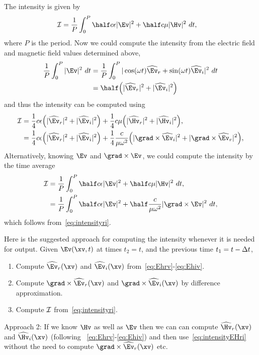 The intensity is given by 
\begin{align*}
  \Ic &= {1\over P} \int_0^P \half c\eps \vert \Ev \vert^2 + \half c \mu \vert \Hv \vert^2  ~dt , 
\end{align*}
where $P$ is the period.
Now we could compute the intensity from the electric field and magnetic field values determined above,
\begin{align*}
   {1\over P} \int_0^P \vert \Ev \vert^2 ~dt &= 
              {1\over P} \int_0^P \vert \cos(\omega t)\Ehrv + \sin(\omega t) \Ehiv\vert^2 ~dt \\
            &= \half \Big( \vert\Ehrv\vert^2 +  \vert\Ehiv\vert^2 \Big)
\end{align*}
and thus the intensity can be computed using 
\begin{align}
  \Ic &= \frac{1}{4} c\eps \Big(  \vert\Ehrv\vert^2 +  \vert\Ehiv\vert^2 \Big) +
         \frac{1}{4} c\mu  \Big(  \vert\Hhrv\vert^2 +  \vert\Hhiv\vert^2 \Big) ,    \label{eq:intensityEHri}     \\
      &= \frac{1}{4} c\eps \Big(  \vert\Ehrv\vert^2 +  \vert\Ehiv\vert^2 \Big) +
         \frac{1}{4} \frac{c}{\mu\omega^2}  \Big(  \vert \grad\times\Ehiv\vert^2 +  \vert\grad\times\Ehrv\vert^2 \Big) , \label{eq:intensityri}
\end{align}
%
Alternatively, knowing $\Ev$ and $\grad\times\Ev$, we could compute the intensity by the time average
\begin{align*}
  \Ic &= {1\over P} \int_0^P \half c\eps \vert \Ev \vert^2 + \half c \mu \vert \Hv \vert^2  ~dt, \\
      &= {1\over P} \int_0^P \half c\eps \vert \Ev \vert^2 + \half \frac{c}{\mu\omega^2} \vert \grad\times\Ev \vert^2  ~dt , \\
\end{align*}
which follows from~\eqref{eq:intensityri}.


Here is the suggested approach for computing the intensity whenever it is needed for output.
Given $\Ev(\xv,t)$ at times $t_2=t$, and the previous time $t_1=t-{\Delta t}$,
\begin{enumerate}
  \item Compute $\Ehrv(\xv)$ and $\Ehiv(\xv)$  from~\eqref{eq:Ehrv}-\eqref{eq:Ehiv}.
  \item Compute $\grad\times \Ehrv(\xv)$ and $\grad\times\Ehiv(\xv)$ by difference approximation.
  \item Compute ${\mathcal I}$ from~\eqref{eq:intensityri}.
\end{enumerate}

Approach 2: If we know $\Hv$ as well as $\Ev$ then we can can compute $\Hhrv(\xv)$ and $\Hhiv(\xv)$ (following ~\eqref{eq:Ehrv}-\eqref{eq:Ehiv})
and then use~\eqref{eq:intensityEHri} without the need to compute $\grad\times\Ehrv(\xv)$ etc.

